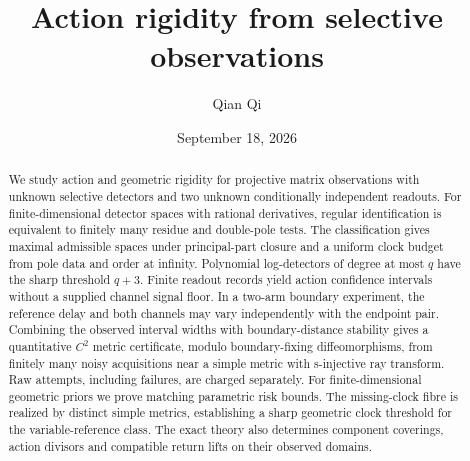 \documentclass[11pt,reqno]{amsart}
\title[Action rigidity from selective observations]{Action rigidity from selective observations}
\author{Qian Qi}
\date{September 18, 2026}
\numberwithin{equation}{section}
\theoremstyle{definition}\newtheorem{definition}[theorem]{Definition}
\theoremstyle{remark}\newtheorem{remark}[theorem]{Remark}
\begin{document}
\begin{abstract}
We study action and geometric rigidity for projective matrix observations
with unknown selective detectors and two unknown conditionally independent
readouts. For finite-dimensional detector spaces with rational derivatives,
regular identification is equivalent to finitely many residue and
double-pole tests. The classification gives maximal admissible spaces
under principal-part closure and a uniform clock budget from pole data
and order at infinity. Polynomial log-detectors of degree at most $q$
have the sharp threshold $q+3$. Finite readout records yield action
confidence intervals without a supplied channel signal floor. In a
two-arm boundary experiment, the reference delay and both channels may
vary independently with the endpoint pair. Combining the observed
interval widths with boundary-distance stability gives a quantitative
$C^2$ metric certificate, modulo boundary-fixing diffeomorphisms, from
finitely many noisy acquisitions near a simple metric with s-injective
ray transform. Raw attempts, including failures, are charged separately.
For finite-dimensional geometric priors we prove matching parametric
risk bounds. The missing-clock fibre is realized by distinct simple
metrics, establishing a sharp geometric clock threshold for the
variable-reference class. The exact theory also determines component
coverings, action divisors and compatible return lifts on their observed
domains.
\end{abstract}
\maketitle
\setcounter{tocdepth}{1}
\tableofcontents
\end{document}
